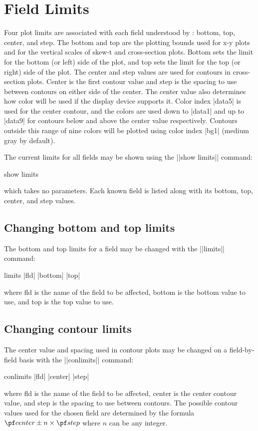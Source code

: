 \section{Field Limits}
Four plot limits are associated with each field understood by \suds:
bottom, top, center, and step.  The bottom and top are the plotting bounds
used for x-y plots and for the vertical scales of skew-t and cross-section
plots.  Bottom sets the limit for the bottom (or left) side of the plot,
and top sets the limit for the top (or right) side of the plot.  The center
and step values are used for contours in cross-section plots.  Center is
the first contour value and step is the spacing to use between contours on
either side of the center.  The center value also determines how color will
be used if the display device supports it.  Color index |data5| is used for
the center contour, and the colors are used down to |data1| and up to
|data9| for contours below and above the center value respectively.
Contours outside this range of nine colors will be plotted using color
index |bg1| (medium gray by default).

The current limits for all fields may be shown using the ||show limits|| 
command:
\begin{example}
	show limits
\end{example}
which takes no parameters.  Each known field is listed along with its 
bottom, top, center, and step values.

\subsection{Changing bottom and top limits}
The bottom and top limits for a field may be changed 
with the ||limits|| command:
\begin{example}
	limits |fld| |bottom| |top|
\end{example}
where {\pf fld} is the name of the field to be affected, {\pf bottom} is
the bottom value to use, and {\pf top} is the top value to use.

\subsection{Changing contour limits}
The center value and spacing used in contour plots may be changed on a
field-by-field basis with the ||conlimits|| command:
\begin{example}
	conlimits |fld| |center| |step|
\end{example}
where {\pf fld} is the name of the field to be affected, {\pf center} is
the center contour value, and {\pf step} is the spacing to use between 
contours.  The possible contour values used for the chosen field are determined
by the formula ${\pf center}\pm n\times{\pf step}$ where $n$ can be any 
integer.  


